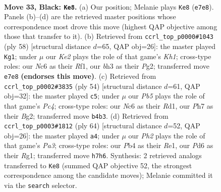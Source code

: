 \documentclass[11pt]{article}
\begin{document}
\clearpage

\begin{figure}[p]\centering
\begin{subfigure}{0.46\textwidth}\centering
\resizebox{\linewidth}{!}{%
\newchessgame
\chessboard[
  setfen={r6r/4k1bp/p1np2p1/4p1P1/1p2P2P/5PBB/PPPK4/R1R5 b - - 1 33},
  showmover=false,
  pgfstyle=straightmove, color=movearrow, markmove={e7-e8}
]}
\caption{}
\end{subfigure}\hfill
\begin{subfigure}{0.46\textwidth}\centering
\resizebox{\linewidth}{!}{%
\newchessgame
\chessboard[
  setfen={3rrbk1/p4p2/1p1ppP1p/7p/P1PBP3/1P6/6PP/4RR1K w - - 0 30},
  showmover=false,
  pgfstyle=straightmove, color=movearrow, markmove={h1-g1}
]}
\caption{}
\end{subfigure}
\\[4pt]
\begin{subfigure}{0.46\textwidth}\centering
\resizebox{\linewidth}{!}{%
\newchessgame
\chessboard[
  setfen={2b2rk1/3nbp1p/r3p1p1/4P1P1/2P4P/1p1NB3/1P4B1/1K1R3R w - - 2 28},
  showmover=false,
  pgfstyle=straightmove, color=movearrow, markmove={c4-c5}
]}
\caption{}
\end{subfigure}\hfill
\begin{subfigure}{0.46\textwidth}\centering
\resizebox{\linewidth}{!}{%
\newchessgame
\chessboard[
  setfen={4bk1r/p4pp1/1p6/nPp2P1r/3pP3/P2B2P1/2P2N2/2K1R1R1 w - - 7 33},
  showmover=false,
  pgfstyle=straightmove, color=movearrow, markmove={a3-a4}
]}
\caption{}
\end{subfigure}
\caption{\textbf{Move 33, Black: \texttt{Ke8}.} (a) Our position; Melanie plays \texttt{Ke8} (\texttt{e7e8}). Panels (b)--(d) are the retrieved master positions whose correspondence most drove this move (highest QAP objective among those that transfer to it). (b) Retrieved from \texttt{ccrl\_top\_p0000\#1043} (ply 58) [structural distance $d$=65, QAP obj=26]: the master played \texttt{Kg1}; under $\mu$ our \emph{Ke2} plays the role of that game's \emph{Kh1}; cross-type roles: our \emph{N}c6 as their \emph{R}f1, our \emph{b}h3 as their \emph{P}g2; transferred move \texttt{e7e8} \textbf{(endorses this move)}. (c) Retrieved from \texttt{ccrl\_top\_p0002\#3835} (ply 54) [structural distance $d$=61, QAP obj=32]: the master played \texttt{c5}; under $\mu$ our \emph{Pb5} plays the role of that game's \emph{Pc4}; cross-type roles: our \emph{N}c6 as their \emph{R}d1, our \emph{P}h7 as their \emph{B}g2; transferred move \texttt{b4b3}. (d) Retrieved from \texttt{ccrl\_top\_p0003\#1812} (ply 64) [structural distance $d$=52, QAP obj=26]: the master played \texttt{a4}; under $\mu$ our \emph{Ph2} plays the role of that game's \emph{Pa3}; cross-type roles: our \emph{P}b4 as their \emph{R}e1, our \emph{P}d6 as their \emph{R}g1; transferred move \texttt{h7h6}. Synthesis: 2 retrieved analogs transferred to \texttt{Ke8} (summed QAP objective 52, the strongest correspondence among the candidate moves); Melanie committed it via the \texttt{search} selector.}
\label{fig:thought-m65}
\end{figure}
\end{document}
